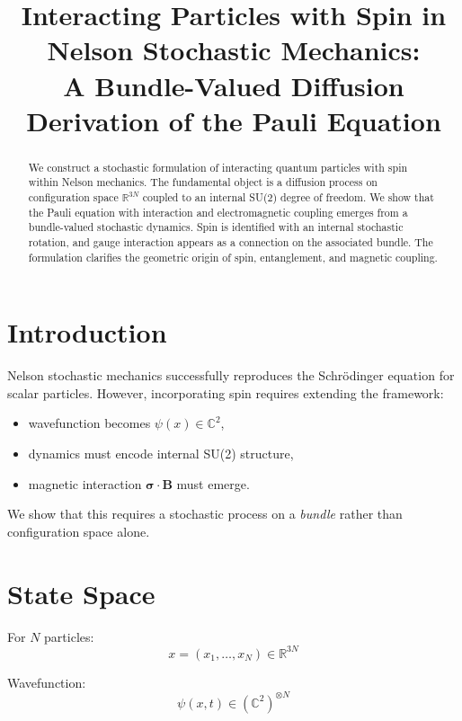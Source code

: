 \documentclass[11pt]{article}
\title{Interacting Particles with Spin in Nelson Stochastic Mechanics:\\
A Bundle-Valued Diffusion Derivation of the Pauli Equation}
\author{}
\date{}
\begin{document}
\maketitle

\begin{abstract}
We construct a stochastic formulation of interacting quantum particles with spin within Nelson mechanics. The fundamental object is a diffusion process on configuration space $\mathbb{R}^{3N}$ coupled to an internal SU(2) degree of freedom. We show that the Pauli equation with interaction and electromagnetic coupling emerges from a bundle-valued stochastic dynamics. Spin is identified with an internal stochastic rotation, and gauge interaction appears as a connection on the associated bundle. The formulation clarifies the geometric origin of spin, entanglement, and magnetic coupling.
\end{abstract}

\section{Introduction}

Nelson stochastic mechanics successfully reproduces the Schr\"odinger equation for scalar particles. However, incorporating spin requires extending the framework:

\begin{itemize}
\item wavefunction becomes $\psi(x) \in \mathbb{C}^2$,
\item dynamics must encode internal SU(2) structure,
\item magnetic interaction $\bm{\sigma}\cdot \mathbf{B}$ must emerge.
\end{itemize}

We show that this requires a stochastic process on a \emph{bundle} rather than configuration space alone.

\section{State Space}

For $N$ particles:
\begin{equation}
x = (x_1,\dots,x_N) \in \mathbb{R}^{3N}
\end{equation}

Wavefunction:
\begin{equation}
\psi(x,t) \in (\mathbb{C}^2)^{\otimes N}
\end{equation}
\end{document}
